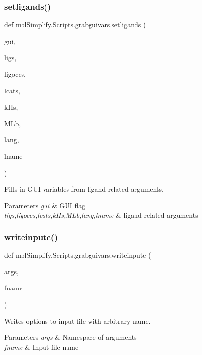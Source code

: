 \subsubsection{\texorpdfstring{setligands()}{setligands()}}
{\footnotesize\ttfamily def mol\+Simplify.\+Scripts.\+grabguivars.\+setligands (\begin{DoxyParamCaption}\item[{}]{gui,  }\item[{}]{ligs,  }\item[{}]{ligoccs,  }\item[{}]{lcats,  }\item[{}]{k\+Hs,  }\item[{}]{M\+Lb,  }\item[{}]{lang,  }\item[{}]{lname }\end{DoxyParamCaption})}



Fills in G\+UI variables from ligand-\/related arguments. 


\begin{DoxyParams}{Parameters}
{\em gui} & G\+UI flag \\
\hline
{\em ligs,ligoccs,lcats,k\+Hs,M\+Lb,lang,lname} & ligand-\/related arguments \\
\hline
\end{DoxyParams}
\mbox{\label{namespacemolSimplify_1_1Scripts_1_1grabguivars_a41afe386ede9bec99dfd85e204d07f12}} 
\subsubsection{\texorpdfstring{writeinputc()}{writeinputc()}}
{\footnotesize\ttfamily def mol\+Simplify.\+Scripts.\+grabguivars.\+writeinputc (\begin{DoxyParamCaption}\item[{}]{args,  }\item[{}]{fname }\end{DoxyParamCaption})}



Writes options to input file with arbitrary name. 


\begin{DoxyParams}{Parameters}
{\em args} & Namespace of arguments \\
\hline
{\em fname} & Input file name \\
\hline
\end{DoxyParams}
\mbox{\label{namespacemolSimplify_1_1Scripts_1_1grabguivars_a63b7dc162860e01a8b1b732bf990fb7c}} 
